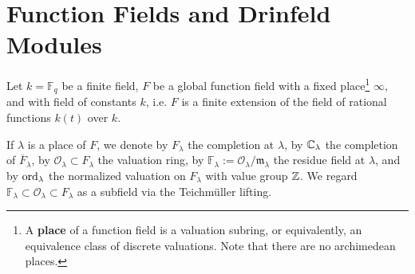 \documentclass{article}
\newcommand{\F}{\mathbb{F}}
\renewcommand{\O}{\mathcal{O}}
\newcommand{\m}{\mathfrak{m}}
\newcommand{\llpar}{(\!(}
\newcommand{\rrpar}{)\!)}
\newcommand{\ab}{\mathrm{ab}}
\begin{document}



\section{Function Fields and Drinfeld Modules}
Let $k = \F_q$ be a finite field,
$F$ be a global function field with a fixed place\footnote{
    A \textbf{place} of a function field is a valuation subring, or equivalently, an equivalence class of discrete valuations.
    Note that there are no archimedean places.
} $\infty$, and with field of constants $k$,
i.e.\! $F$ is a finite extension of the field of rational functions $k(t)$ over $k$.

If $\lambda$ is a place of $F$,
we denote by $F_\lambda$ the completion at $\lambda$, by $\mathbb{C}_\lambda$ the completion of $\overline{F}_\lambda$,
by $\O_\lambda\subset F_\lambda$ the valuation ring,
by $\F_\lambda := \O_\lambda/\m_\lambda$ the residue field at $\lambda$, and by $\operatorname{ord}_\lambda$ the normalized valuation on $F_\lambda$ with value group $\mathbb{Z}$.
We regard $\F_\lambda\subset\O_\lambda\subset F_\lambda$ as a subfield via the Teichm\"uller lifting.
\end{document}
